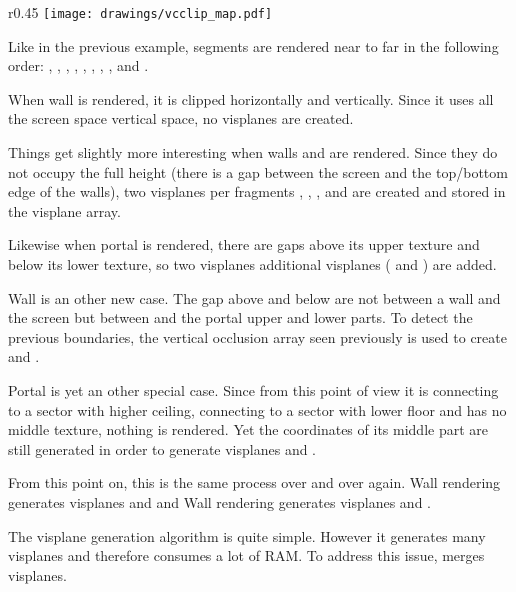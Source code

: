\begin{wrapfigure}[16]{r}{0.45\textwidth}
\centering
\texttt{[image: drawings/vcclip\_map.pdf]}
\end{wrapfigure}
Like in the previous example, segments are rendered near to far in the following order: , , , , , , , , and .\\
\par
When wall  is rendered, it is clipped horizontally and vertically. Since it uses all the screen space vertical space, no visplanes are created.\\
\par
 Things get slightly more interesting when walls  and  are rendered. Since they do not occupy the full height (there is a gap between the screen and the top/bottom edge of the walls), two visplanes per fragments , , , and  are created and stored in the visplane array.\\
 \par
  Likewise when portal  is rendered, there are gaps above its upper texture and below its lower texture, so two visplanes additional visplanes ( and ) are added.\\
\par
Wall  is an other new case. The gap above and below are not between a wall and the screen but between   and the portal  upper and lower parts. To detect the previous boundaries, the vertical occlusion array seen previously is used to create  and  .\\
\par
Portal  is yet an other special case. Since from this point of view it is connecting to a sector with higher ceiling, connecting to a sector with lower floor and has no middle texture, nothing is rendered. Yet the coordinates of its middle part are still generated in order to generate visplanes  and  .\\
\par
From this point on, this is the same process over and over again. Wall  rendering generates visplanes  and   and Wall  rendering generates visplanes  and  .\\
\par
The visplane generation algorithm is quite simple. However it generates many visplanes and therefore consumes a lot of RAM. To address this issue, \doom{} merges visplanes.









